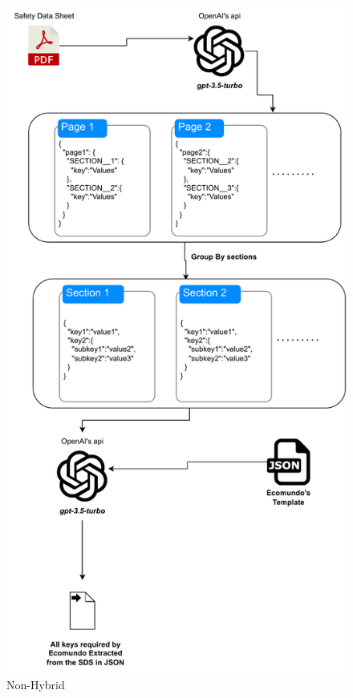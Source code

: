 \documentclass[a4paper,12pt,twoside]{report}
\begin{document}
\begin{figure}[H]
		\includegraphics[width=\textwidth, height=\textheight/2, keepaspectratio ]{images/Non-Hybrid}
	\caption[How the Non-Hybrid code works]{Non-Hybrid}
\label{Non-Hybrid}
\end{figure}
\end{document}

